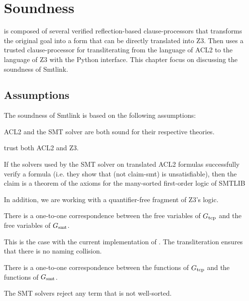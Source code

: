 \chapter{Soundness}
\label{ch:soundness}

\smtlink{} is composed of several verified reflection-based clause-processors
that transforms the original goal into a form that can be directly translated
into Z3.
Then \smtlink{} uses a trusted clause-processor for transliterating from the
language of ACL2 to the language of Z3 with the Python interface.
This chapter focus on discussing the soundness of Smtlink.

\section{Assumptions}\label{sec:soundness:assumpt}
The soundness of Smtlink is based on the following assumptions:

\begin{assumption}\label{sec:soundness:assumpt1}
  ACL2 and the \acs{SMT} solver are both sound for their respective
  theories.
\end{assumption}
\smtlink{} trust both ACL2 and Z3.

\begin{assumption}\label{sec:soundness:assumpt2}
  If the solvers used by the SMT solver on translated ACL2 formulas
  successfully verify a formula (i.e. they show that (not claim-smt)
  is unsatisfiable), then the claim is a theorem of the axioms for the
  many-sorted first-order logic of SMTLIB
\end{assumption}
In addition, we are working with a quantifier-free fragment of Z3's
logic.

\begin{assumption}
  There is a one-to-one correspondence between the free variables of $G_{\mathrm{tcp}}$
  and the free variables of $G_{\mathrm{smt}}$.
\end{assumption}
This is the case with the current implementation of \smtlink{}. The
transliteration ensures that there is no naming collision.

\begin{assumption}
  There is a one-to-one correspondence between the functions of $G_{\mathrm{tcp}}$
  and the functions of $G_{\mathrm{smt}}$.
\end{assumption}

\begin{assumption}
  The SMT solvers reject any term that is not well-sorted.
\end{assumption}

